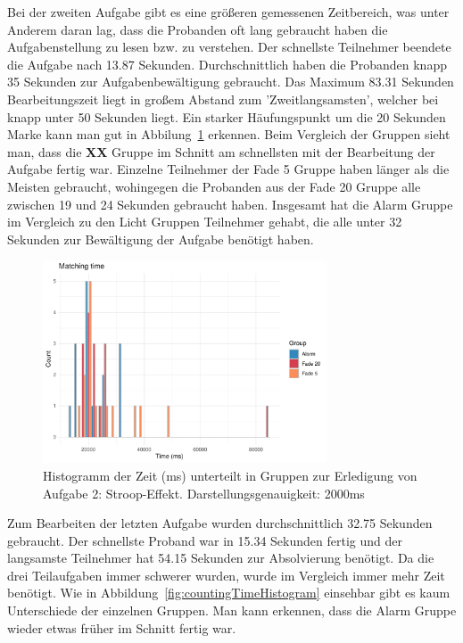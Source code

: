 Bei der zweiten Aufgabe gibt es eine größeren gemessenen Zeitbereich, was unter Anderem daran lag, dass die Probanden oft lang gebraucht haben die Aufgabenstellung zu lesen bzw. zu verstehen. Der schnellste Teilnehmer beendete die Aufgabe nach 13.87 Sekunden. Durchschnittlich haben die Probanden knapp 35 Sekunden zur Aufgabenbewältigung gebraucht. Das Maximum 83.31 Sekunden Bearbeitungszeit liegt in großem Abstand zum 'Zweitlangsamsten', welcher bei knapp unter 50 Sekunden liegt. Ein starker Häufungspunkt um die 20 Sekunden Marke kann man gut in Abbilung~\ref{fig:matchingTimeHistogram} erkennen. 
Beim Vergleich der Gruppen sieht man, dass die \textbf{XX} Gruppe im Schnitt am schnellsten mit der Bearbeitung der Aufgabe fertig war. Einzelne Teilnehmer der Fade 5 Gruppe haben länger als die Meisten gebraucht, wohingegen die Probanden aus der Fade 20 Gruppe alle zwischen 19 und 24 Sekunden gebraucht haben. Insgesamt hat die Alarm Gruppe im Vergleich zu den Licht Gruppen Teilnehmer gehabt, die alle unter 32 Sekunden zur Bewältigung der Aufgabe benötigt haben.

\begin{figure}[H]
	\centering
	\includegraphics[width=0.75\textwidth]{./_StudyResults/matchingTimeHist}
	\caption{Histogramm der Zeit (ms) unterteilt in Gruppen zur Erledigung von Aufgabe 2: Stroop-Effekt. Darstellungsgenauigkeit: 2000ms}
	\label{fig:matchingTimeHistogram}
\end{figure}

Zum Bearbeiten der letzten Aufgabe wurden durchschnittlich 32.75 Sekunden gebraucht. Der schnellste Proband war in 15.34 Sekunden fertig und der langsamste Teilnehmer hat 54.15 Sekunden zur Absolvierung benötigt. Da die drei Teilaufgaben immer schwerer wurden, wurde im Vergleich immer mehr Zeit benötigt.
Wie in Abbildung~\ref{fig:countingTimeHistogram} einsehbar gibt es kaum Unterschiede der einzelnen Gruppen. Man kann erkennen, dass die Alarm Gruppe wieder etwas früher im Schnitt fertig war. 

